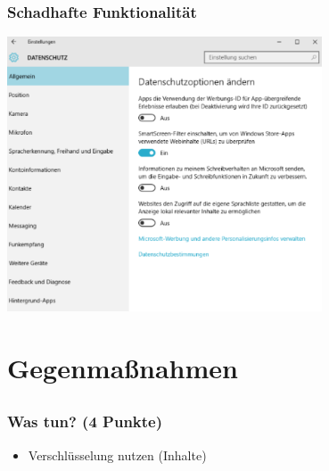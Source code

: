 \documentclass[12pt]{beamer}
\begin{document}
\begin{frame}
    \frametitle{Schadhafte Funktionalität}
    \begin{center}
      \includegraphics[width=0.7\textwidth]{img/windows10.png}
    \end{center}
\end{frame}

\section{Gegenmaßnahmen}
\subsection{}

\begin{frame}
  \frametitle{Was tun? (4 Punkte)}
  \begin{itemize}
    \item Verschlüsselung nutzen (Inhalte)
  \end{itemize}
\end{frame}
\end{document}
